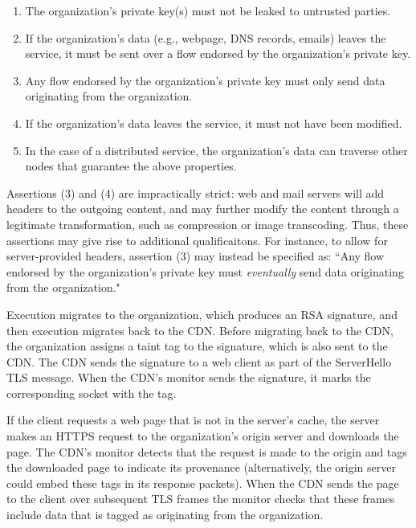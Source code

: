 
\begin{enumerate}
    \item The organization's private key(s) must not be leaked to untrusted parties.

    \item If the organization's data (e.g., webpage, DNS records, emails) leaves the
        service, it must be sent over a flow endorsed by the organization's private
        key.

    \item Any flow endorsed by the organization's private key must only send
        data originating from the organization.

    \item If the organization's data leaves the service, it must not have been
        modified.

    \item In the case of a distributed service, the organization's data can
        traverse other nodes that  guarantee the above properties.
\end{enumerate}

Assertions (3) and (4) are impractically strict: web and mail servers will add
headers to the outgoing content, and may further modify the content through a
legitimate transformation, such as compression or image transcoding.
%
Thus, these assertions may give rise to additional qualificaitons.
%
For instance, to allow for server-provided headers, assertion (3) may instead
be specified as: ``Any flow endorsed by the organization's private key must
\emph{eventually} send data originating from the organization."


%
Execution migrates to the organization, which produces an RSA signature, and
then execution migrates back to the CDN\@.
%
Before migrating back to the CDN, the organization assigns a taint tag to the
signature, which is also sent to the CDN\@.
%
The CDN sends the signature to a web client as part of the ServerHello TLS
message.
%
When the CDN's monitor sends the signature, it marks the corresponding socket
with the tag.


If the client requests a web page that is not in the server's cache, the server
makes an HTTPS request to the organization's origin server and downloads the
page.
%
The CDN's monitor detects that the request is made to the origin and tags the
downloaded page to indicate its provenance (alternatively, the origin server
could embed these tags in its response packets).
%
When the CDN sends the page to the client over subsequent TLS frames the
monitor checks that these frames include data that is tagged as originating
from the organization. 


